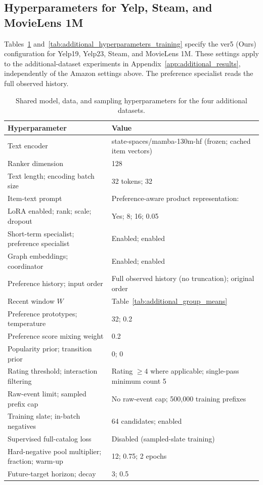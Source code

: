 ﻿\documentclass[sigconf,anonymous,review]{acmart}
\begin{document}
\subsection{Hyperparameters for Yelp, Steam, and MovieLens 1M}
\label{app:additional_hyperparameters}
Tables~\ref{tab:additional_hyperparameters_model} and~\ref{tab:additional_hyperparameters_training} specify the ver5 (Ours) configuration for Yelp19, Yelp23, Steam, and MovieLens 1M. These settings apply to the additional-dataset experiments in Appendix~\ref{app:additional_results}, independently of the Amazon settings above. The preference specialist reads the full observed history.

\begin{table}[!tbp]
    \centering
    \small
    \setlength{\tabcolsep}{5pt}
    \renewcommand{\arraystretch}{1.08}
    \begin{tabular}{p{}p{}}
        \toprule
        \textbf{Hyperparameter} & \textbf{Value} \\
        \midrule
        Text encoder & state-spaces/mamba-130m-hf (frozen; cached item vectors) \\
        Ranker dimension & 128 \\
        Text length; encoding batch size & 32 tokens; 32 \\
        Item-text prompt & Preference-aware product representation: \\
        LoRA enabled; rank; scale; dropout & Yes; 8; 16; 0.05 \\
        Short-term specialist; preference specialist & Enabled; enabled \\
        Graph embeddings; coordinator & Enabled; enabled \\
        Preference history; input order & Full observed history (no truncation); original order \\
        Recent window $W$ & Table~\ref{tab:additional_group_means} \\
        Preference prototypes; temperature & 32; 0.2 \\
        Preference score mixing weight & 0.2 \\
        Popularity prior; transition prior & 0; 0 \\
        Rating threshold; interaction filtering & Rating $\geq 4$ where applicable; single-pass minimum count 5 \\
        Raw-event limit; sampled prefix cap & No raw-event cap; 500,000 training prefixes \\
        Training slate; in-batch negatives & 64 candidates; enabled \\
        Supervised full-catalog loss & Disabled (sampled-slate training) \\
        Hard-negative pool multiplier; fraction; warm-up & 12; 0.75; 2 epochs \\
        Future-target horizon; decay & 3; 0.5 \\
        \bottomrule
    \end{tabular}
    \caption{Shared model, data, and sampling hyperparameters for the four additional datasets.}
    \label{tab:additional_hyperparameters_model}
\end{table}
\end{document}
